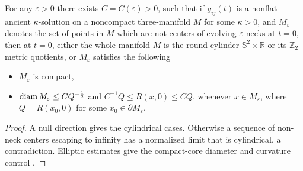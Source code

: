 \begin{corollary} 
  \label{cor:cz-noncompact-ancient-cap-neck-structure}

For any $\varepsilon>0$ there exists $C=C(\varepsilon)>0$, such
that if $g_{ij}(t)$ is a nonflat ancient $\kappa$-solution on a
noncompact three-manifold $M$ for some $\kappa>0$, and
$M_\varepsilon$ denotes the set of points in $M$ which are not
centers of evolving $\varepsilon$-necks at $t=0$, then at $t=0$,
either the whole manifold $M$ is the round cylinder $\mathbb{S}^2
\times \mathbb{R}$ or its $\mathbb{Z}_2$ metric quotients, or
$M_\varepsilon$ satisfies the following
\begin{itemize}
\item[(i)] $M_\varepsilon$ is compact, \item[(ii)] ${\rm diam}\,
M_\varepsilon \le CQ^{-\frac{1}{2}}$ and $C^{-1}Q\le R(x,0)\le
CQ$, whenever $x\in M_\varepsilon$, where $Q=R(x_0,0)$ for some
$x_0\in\partial M_\varepsilon$.
\end{itemize}
\end{corollary}
\begin{proof}
\sketch A null direction gives the cylindrical cases.  Otherwise a
sequence of non-neck centers escaping to infinity has a normalized
limit that is cylindrical, a contradiction.  Elliptic estimates give
the compact-core diameter and curvature control \cite{P1}.
\end{proof}
